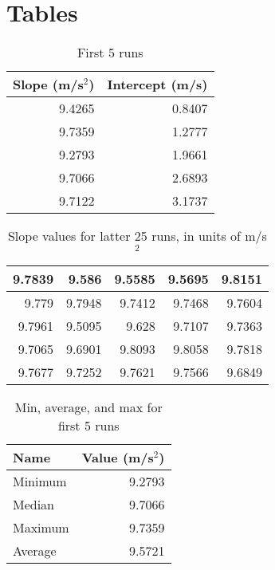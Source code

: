 \section{Tables}
%
\begin{table}[ht]
    \centering
    \begin{tabular}{|r|r|}
        \hline
        Slope (m/s$^{2}$) & Intercept (m/s) \\
        \hline
        9.4265 & 0.8407 \\
        9.7359 & 1.2777 \\
        9.2793 & 1.9661 \\
        9.7066 & 2.6893 \\
        9.7122 & 3.1737 \\
        \hline
    \end{tabular}
    \caption{First 5 runs}
    \label{table:01.first.5}
\end{table}
%
\begin{table}[ht]
    \centering
    \begin{tabular}{|r|r|r|r|r|}
        \hline
        9.7839 & 9.586 & 9.5585 & 9.5695 & 9.8151 \\
        \hline
        9.779 & 9.7948 & 9.7412 & 9.7468 & 9.7604 \\
        \hline
        9.7961 & 9.5095 & 9.628 & 9.7107 & 9.7363 \\
        \hline
        9.7065 & 9.6901 & 9.8093 & 9.8058 & 9.7818 \\
        \hline
        9.7677 & 9.7252 & 9.7621 & 9.7566 & 9.6849 \\
        \hline
    \end{tabular}
    \caption{Slope values for latter 25 runs, in units of m/s$^{2}$}
    \label{table:01.latter.25}
\end{table}
%
\begin{table}[ht]
    \centering
    \begin{tabular}{|l|r|}
        \hline
        Name & Value (m/s$^{2}$) \\
        \hline
        Minimum & 9.2793 \\
        Median & 9.7066 \\
        Maximum & 9.7359 \\
        Average & 9.5721 \\
        \hline
    \end{tabular}
    \caption{Min, average, and max for first 5 runs}
    \label{table:01.describe.5}
\end{table}
